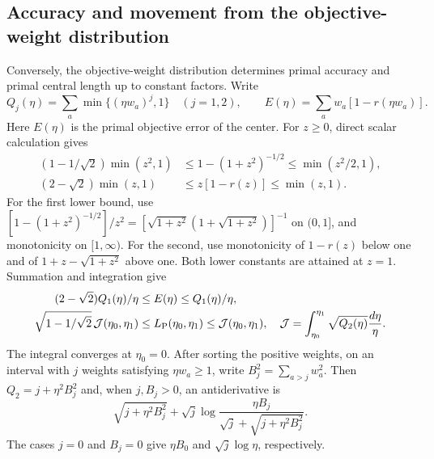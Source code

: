 \subsection{Accuracy and movement from the objective-weight distribution}
Conversely, the objective-weight distribution determines primal
accuracy and primal central length up to constant factors. Write
\[
 Q_j(\eta)=\sum_a\min\{(\eta w_a)^j,1\}\quad(j=1,2),\qquad
 E(\eta)=\sum_a w_a[1-r(\eta w_a)].
\]
Here $E(\eta)$ is the primal objective error of the center. For $z\geq0$, direct scalar calculation gives
\begin{align*}
 (1-1/\sqrt2)\min(z^2,1)
 &\leq1-(1+z^2)^{-1/2}\leq\min(z^2/2,1),\\
 (2-\sqrt2)\min(z,1)
 &\leq z[1-r(z)]\leq\min(z,1).
\end{align*}
For the first lower bound, use
$[1-(1+z^2)^{-1/2}]/z^2=
[\sqrt{1+z^2}(1+\sqrt{1+z^2})]^{-1}$ on $(0,1]$, and
monotonicity on $[1,\infty)$. For the second, use monotonicity of
$1-r(z)$ below one and of $1+z-\sqrt{1+z^2}$ above one.
Both lower constants are attained at $z=1$. Summation and integration
give
\begin{align}
 (2-\sqrt2)Q_1(\eta)/\eta&\leq E(\eta)\leq Q_1(\eta)/\eta,
 \label{eq:pd-distribution-error}\\
 \sqrt{1-1/\sqrt2}\,\mathcal J(\eta_0,\eta_1)
 &\leq L_{\rm P}(\eta_0,\eta_1)\leq\mathcal J(\eta_0,\eta_1),
 \quad
 \mathcal J=\int_{\eta_0}^{\eta_1}\sqrt{Q_2(\eta)}\frac{d\eta}{\eta}.
 \label{eq:pd-distribution-length}
\end{align}
The integral converges at $\eta_0=0$. After sorting the positive
weights, on an interval with $j$ weights satisfying $\eta w_a\geq1$,
write $B_j^2=\sum_{a>j}w_a^2$. Then $Q_2=j+\eta^2B_j^2$ and,
when $j,B_j>0$, an antiderivative is
\[
 \sqrt{j+\eta^2B_j^2}+\sqrt j\log
 \frac{\eta B_j}{\sqrt j+\sqrt{j+\eta^2B_j^2}}.
\]
The cases $j=0$ and $B_j=0$ give $\eta B_0$ and
$\sqrt j\log\eta$, respectively.


